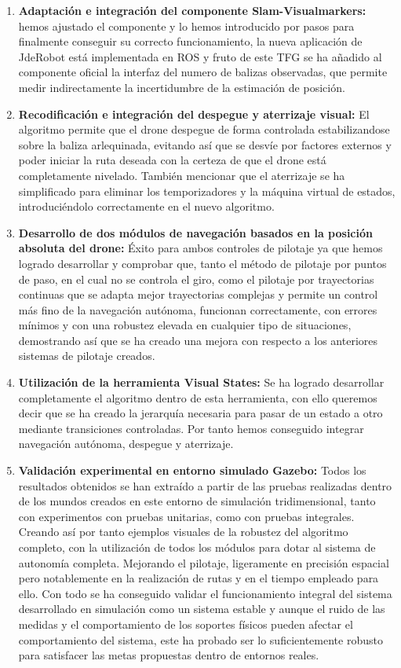 \begin{enumerate}
	\item{\textbf{Adaptación e integración del componente Slam-Visualmarkers:} hemos ajustado el componente y lo hemos introducido por pasos para finalmente conseguir su correcto funcionamiento, la nueva aplicación de JdeRobot está implementada en ROS y fruto de este TFG se ha añadido al componente oficial la interfaz del numero de balizas observadas, que permite medir indirectamente la incertidumbre de la estimación de posición.}	
	\item{\textbf{Recodificación e integración del despegue y aterrizaje visual:} El algoritmo permite que el drone despegue de forma controlada estabilizandose sobre la baliza arlequinada, evitando así que se desvíe por factores externos y poder iniciar la ruta deseada con la certeza de que el drone está completamente nivelado. También mencionar que el aterrizaje se ha simplificado para eliminar los temporizadores y la máquina virtual de estados, introduciéndolo correctamente en el nuevo algoritmo.}
	\item{\textbf{Desarrollo de dos módulos de navegación basados en la posición absoluta del drone:} Éxito para ambos controles de pilotaje ya que hemos logrado desarrollar y comprobar que, tanto el método de pilotaje por puntos de paso, en el cual no se controla el giro, como el pilotaje por trayectorias continuas que se
adapta mejor trayectorias complejas y permite un control más fino de la navegación autónoma, funcionan correctamente, con errores mínimos y con una robustez elevada en cualquier tipo de situaciones, demostrando así que se ha creado una mejora con respecto a los anteriores sistemas de pilotaje creados.}
	\item{\textbf{Utilización de la herramienta Visual States:} Se ha logrado desarrollar completamente el algoritmo dentro de esta herramienta, con ello queremos decir que se ha creado la jerarquía necesaria para pasar de un estado a otro mediante transiciones controladas. Por tanto hemos conseguido integrar navegación autónoma, despegue y aterrizaje.}	
	\item{\textbf{Validación experimental en entorno simulado Gazebo:} Todos los resultados obtenidos se han extraído a partir de las pruebas realizadas dentro de los mundos creados en este entorno de simulación tridimensional, tanto con experimentos con pruebas unitarias, como con pruebas integrales. Creando así por tanto ejemplos visuales de la robustez del algoritmo completo, con la utilización de todos los módulos para dotar al sistema de autonomía completa. Mejorando el pilotaje, ligeramente en precisión espacial pero notablemente en la realización de rutas y en el tiempo empleado para ello. Con todo se ha conseguido validar el funcionamiento integral del sistema desarrollado en simulación como un sistema estable y aunque el ruido de las medidas y el comportamiento de los soportes físicos pueden afectar el comportamiento del sistema, este ha probado ser lo suficientemente robusto para satisfacer las metas propuestas dentro de entornos reales.}
\end{enumerate}


